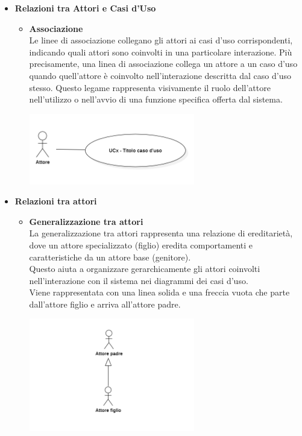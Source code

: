 \begin{itemize}
    \item \textbf{Relazioni tra Attori e Casi d'Uso} \\
    \begin{itemize}
        \item \textbf{Associazione} \\
        Le linee di associazione collegano gli attori ai casi d'uso corrispondenti, indicando quali attori sono coinvolti in una particolare interazione. Più precisamente, una linea di associazione collega un attore a un caso d'uso quando quell'attore è coinvolto nell'interazione descritta dal caso d'uso stesso. Questo legame rappresenta visivamente il ruolo dell'attore nell'utilizzo o nell'avvio di una funzione specifica offerta dal sistema.
        \begin{minipage}[t]{\linewidth}
            \centering
            \includegraphics[width=0.6\textwidth]{../Images/NormeDiProgetto/Associazione.PNG}
        \end{minipage}
    \end{itemize}

    \item \textbf{Relazioni tra attori}
    \begin{itemize}
        \item \textbf{Generalizzazione tra attori} \\
        La generalizzazione tra attori rappresenta una relazione di ereditarietà, dove un attore specializzato (figlio) eredita comportamenti e caratteristiche da un attore base (genitore). \\
        Questo aiuta a organizzare gerarchicamente gli attori coinvolti nell'interazione con il sistema nei diagrammi dei casi d'uso. \\
        Viene rappresentata con una linea solida e una freccia vuota che parte dall'attore figlio e arriva all'attore padre.
        \begin{minipage}[t]{\linewidth}
            \centering
            \includegraphics[width=0.6\textwidth]{../Images/NormeDiProgetto/GeneralizzazioneAttori.PNG}
        \end{minipage}
    \end{itemize}
    

\end{itemize}
